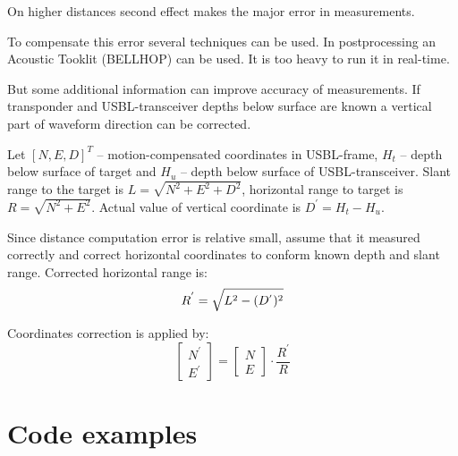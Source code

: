 \documentclass[10pt,letterpaper]{article}
\numberwithin{equation}{section}
\numberwithin{figure}{section}
\numberwithin{table}{section}
\begin{document}
On higher distances second effect makes the major error in measurements.

To compensate this error several techniques can be used. In postprocessing an
Acoustic Tooklit (BELLHOP) can be used. It is too heavy to run it in real-time.

But some additional information can improve accuracy of measurements.
If transponder and USBL-transceiver depths below surface are known a vertical
part of waveform direction can be corrected.

Let $[ N, E, D ]^{T}$ -- motion-compensated coordinates in USBL-frame, $H_{t}$ --
depth below surface of target and $H_{u}$ -- depth below surface of
USBL-transceiver. Slant range to the target is $L = \sqrt{N^2 + E^2 + D^2}$,
horizontal range to target is $R = \sqrt{N^2 + E^2}$. Actual value of vertical
coordinate is $D^{'} = H_{t} - H_{u}$.

Since distance computation error is relative small, assume that it measured
correctly and correct horizontal coordinates to conform known depth and slant range.
Corrected horizontal range is:
\begin{equation}
    R^{'} = \sqrt{L^2 - (D^{'})^2} \\
\end{equation}

Coordinates correction is applied by:
\begin{equation}
    \begin{bmatrix}
        N^{'} \\ E^{'}
    \end{bmatrix} = \begin{bmatrix}
        N \\ E
    \end{bmatrix} \cdot \frac{R^{'}}{R}
\end{equation}


\section{Code examples}

\lstset{language=Matlab,frame=single}











\end{document}

